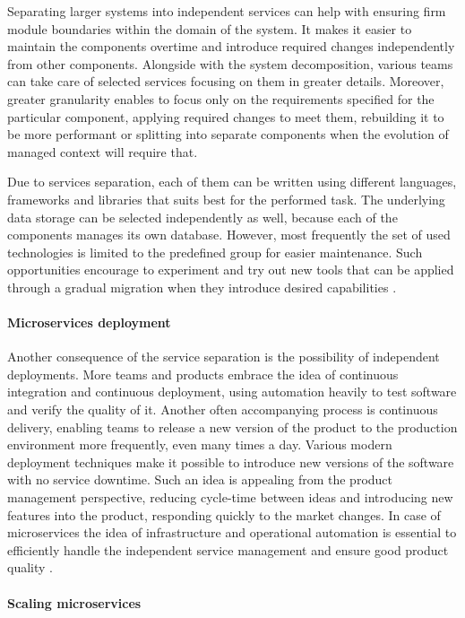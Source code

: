 Separating larger systems into independent services can help with ensuring firm module boundaries within the domain of the system. It makes it easier to maintain the components overtime and introduce required changes independently from other components. Alongside with the system decomposition, various teams can take care of selected services focusing on them in greater details. Moreover, greater granularity enables to focus only on the requirements specified for the particular component, applying required changes to meet them, rebuilding it to be more performant or splitting into separate components when the evolution of managed context will require that.

Due to services separation, each of them can be written using different languages, frameworks and libraries that suits best for the performed task. The underlying data storage can be selected independently as well, because each of the components manages its own database. However, most frequently the set of used technologies is limited to the predefined group for easier maintenance. Such opportunities encourage to experiment and try out new tools that can be applied through a gradual migration when they introduce desired capabilities \cite{FowlerMicroservicesTradeoffs}.

\paragraph{Microservices deployment}

Another consequence of the service separation is the possibility of independent deployments. More teams and products embrace the idea of continuous integration and continuous deployment, using automation heavily to test software and verify the quality of it. Another often accompanying process is continuous delivery, enabling teams to release a new version of the product to the production environment more frequently, even many times a day. Various modern deployment techniques make it possible to introduce new versions of the software with no service downtime. Such an idea is appealing from the product management perspective, reducing cycle-time between ideas and introducing new features into the product, responding quickly to the market changes. In case of microservices the idea of infrastructure and operational automation is essential to efficiently handle the independent service management and ensure good product quality \cite{FowlerMicroservicesTradeoffs}.

\paragraph{Scaling microservices}

